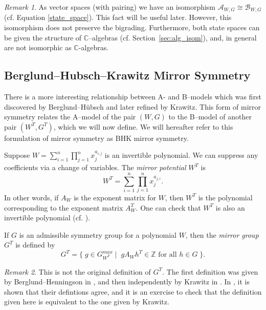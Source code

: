 \documentclass[10pt, letterpaper]{amsart}
\theoremstyle{remark}
\newtheorem{rem}{Remark}[thm]
\newcommand{\CC}{\mathbb C}
\newcommand{\ZZ}{\mathbb{Z}}
\newcommand{\sA}{\mathscr{A}}
\newcommand{\sB}{\mathscr{B}}
\newcommand{\set}[1]{\{#1\}}
\newcommand{\defital}{\textit}
\begin{document}
\begin{rem}\label{r:ABiso}
As vector spaces (with pairing) we have an isomorphism $\sA_{W,G}\cong \sB_{W,G}$ (cf. Equation \ref{state_space}). This fact will be useful later. However, this isomorphism does not preserve the bigrading. Furthermore, both state spaces can be given the structure of $\CC$--algebras (cf. Section~\ref{sec:alg_isom}), and, in general are not isomorphic as $\CC$-algebras. 
\end{rem}



\subsection{Berglund--Hubsch--Krawitz Mirror Symmetry}\label{sec:BHK}
There is a more interesting relationship between A- and B--models which was first discovered by Berglund--H\"ubsch and later refined by Krawitz. This form of mirror symmetry relates the A--model of the pair $(W,G)$ to the B--model of another pair $(W^T, G^T)$, which we will now define. We will hereafter refer to this formulation of mirror symmetry as BHK mirror symmetry.  

Suppose $W=\sum_{i=1}^n  \prod_{j=1}^n x_j^{a_{i,j}}$ is an invertible polynomial. We can suppress any coefficients via a change of variables. The \defital{mirror potential} $W^T$ is 
\[
W^T = \sum_{i=1}^n  \prod_{j=1}^n x_j^{a_{j,i}}. 
\]
In other words, if $A_W$ is the exponent matrix for $W$, then $W^T$ is the polynomial corresponding to the exponent matrix $A_W^T$. One can check that $W^T$ is also an invertible polynomial (cf. \cite{ChR}). 
 
If $G$ is an admissible symmetry group for a polynomial $W$, then the \defital{mirror group} $G^T$ is defined by 
\[
G^T = \set{\; g \in G_{W^T}^{max} \; | \;\;g A_{W} h^T \in \ZZ \text{ for all } h \in G \; }.
\]
\begin{rem}
This is not the original definition of $G^T$. The first definition was given by Berglund--Henningson in \cite{BHen}, and then independently by Krawitz in \cite{Kr}. In \cite{involutions}, it is shown that their defintions agree, and it is an exercise to check that the definition given here is equivalent to the one given by Krawitz. 
\end{rem}
\end{document}
